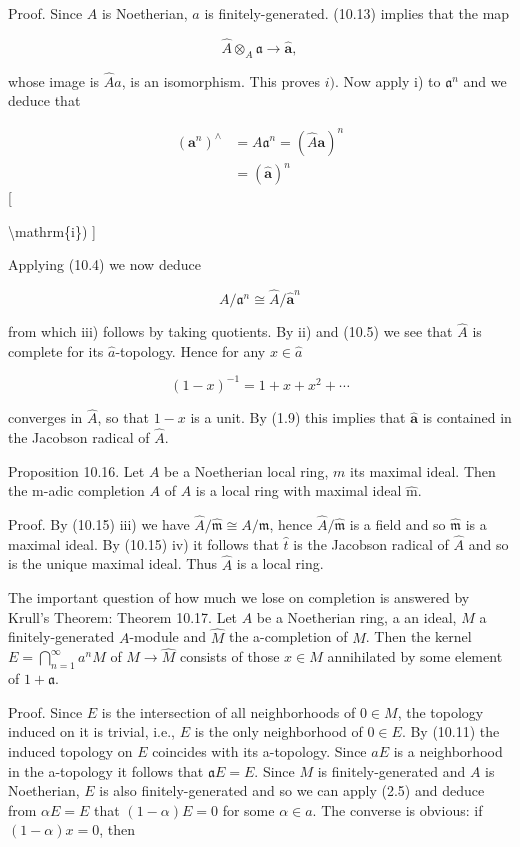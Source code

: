\documentclass{standalone}
\theoremstyle{definition}
\theoremstyle{remark}
\begin{document}
Proof. Since $A$ is Noetherian, $a$ is finitely-generated. (10.13) implies that the map

\[
\hat{A} \otimes_{A} \mathfrak{a} \rightarrow \hat{\mathbf{a}},
\]

whose image is $\hat{A} a$, is an isomorphism. This proves $i)$. Now apply i) to $\mathfrak{a}^{n}$ and we deduce that

\[
\begin{aligned}
\left(\mathbf{a}^{n}\right)^{\wedge} & =A \mathfrak{a}^{n}=(\hat{A} \mathbf{a})^{n} \\
& =(\hat{\mathbf{a}})^{n}
\end{aligned}
\][

 \textbackslash mathrm\{i\}) 
]

Applying (10.4) we now deduce

\[
A / \mathfrak{a}^{n} \cong \hat{A} / \hat{\mathbf{a}}^{n}
\]

from which iii) follows by taking quotients. By ii) and (10.5) we see that $\hat{A}$ is complete for its $\hat{a}$-topology. Hence for any $x \in \hat{a}$

\[
(1-x)^{-1}=1+x+x^{2}+\cdots
\]

converges in $\hat{A}$, so that $1-x$ is a unit. By (1.9) this implies that $\hat{\mathbf{a}}$ is contained in the Jacobson radical of $\hat{A}$.

Proposition 10.16. Let $A$ be a Noetherian local ring, $m$ its maximal ideal. Then the $\mathrm{m}$-adic completion $A$ of $A$ is a local ring with maximal ideal $\hat{\mathrm{m}}$.

Proof. By (10.15) iii) we have $\hat{A} / \hat{\mathfrak{m}} \cong A / \mathfrak{m}$, hence $\hat{A} / \hat{\mathfrak{m}}$ is a field and so $\hat{\mathfrak{m}}$ is a maximal ideal. By (10.15) iv) it follows that $\hat{t}$ is the Jacobson radical of $\hat{A}$ and so is the unique maximal ideal. Thus $\hat{A}$ is a local ring.

The important question of how much we lose on completion is answered by Krull's Theorem: Theorem 10.17. Let $A$ be a Noetherian ring, a an ideal, $M$ a finitely-generated $A$-module and $\hat{M}$ the a-completion of $M$. Then the kernel $E=\bigcap_{n=1}^{\infty} a^{n} M$ of $M \rightarrow \hat{M}$ consists of those $x \in M$ annihilated by some element of $1+\mathfrak{a}$.

Proof. Since $E$ is the intersection of all neighborhoods of $0 \in M$, the topology induced on it is trivial, i.e., $E$ is the only neighborhood of $0 \in E$. By (10.11) the induced topology on $E$ coincides with its a-topology. Since $a E$ is a neighborhood in the a-topology it follows that $\mathfrak{a} E=E$. Since $M$ is finitely-generated and $A$ is Noetherian, $E$ is also finitely-generated and so we can apply (2.5) and deduce from $\alpha E=E$ that $(1-\alpha) E=0$ for some $\alpha \in a$. The converse is obvious: if $(1-\alpha) x=0$, then
\end{document}
